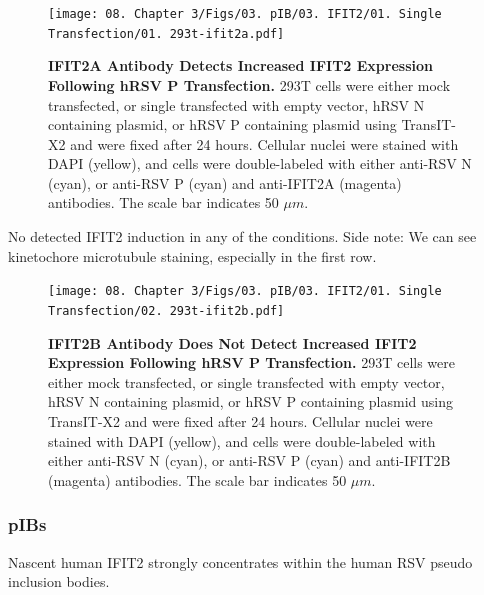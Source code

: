 \begin{figure}
    \centering
    \texttt{[image: 08. Chapter 3/Figs/03. pIB/03. IFIT2/01. Single Transfection/01. 293t-ifit2a.pdf]}
    \caption[IFIT2A Antibody Detects Increased IFIT2 Expression Following hRSV P Transfection.]{\textbf{IFIT2A Antibody Detects Increased IFIT2 Expression Following hRSV P Transfection.} 293T cells were either mock transfected, or single transfected with empty vector, hRSV N containing plasmid, or hRSV P containing plasmid using TransIT-X2 and were fixed after 24 hours. Cellular nuclei were stained with DAPI (yellow), and cells were double-labeled with either anti-RSV N (cyan), or anti-RSV P (cyan) and anti-IFIT2A (magenta) antibodies. The scale bar indicates 50 \(\mu m\).}
    \label{fig:IFIT2A Antibody Detects Increased IFIT2 Expression Following hRSV P Transfection}
\end{figure}

No detected IFIT2 induction in any of the conditions.
Side note: We can see kinetochore microtubule staining, especially in the first row.

\begin{figure}
    \centering
    \texttt{[image: 08. Chapter 3/Figs/03. pIB/03. IFIT2/01. Single Transfection/02. 293t-ifit2b.pdf]}
    \caption[IFIT2B Antibody Does Not Detect Increased IFIT2 Expression Following hRSV P Transfection.]{\textbf{IFIT2B Antibody Does Not Detect Increased IFIT2 Expression Following hRSV P Transfection.} 293T cells were either mock transfected, or single transfected with empty vector, hRSV N containing plasmid, or hRSV P containing plasmid using TransIT-X2 and were fixed after 24 hours. Cellular nuclei were stained with DAPI (yellow), and cells were double-labeled with either anti-RSV N (cyan), or anti-RSV P (cyan) and anti-IFIT2B (magenta) antibodies. The scale bar indicates 50 \(\mu m\).}
    \label{fig:IFIT2B Antibody Does Not Detect Increased IFIT2 Expression Following hRSV P Transfection}
\end{figure}

\subsubsection{pIBs}
Nascent human IFIT2 strongly concentrates within the human RSV pseudo inclusion bodies.

